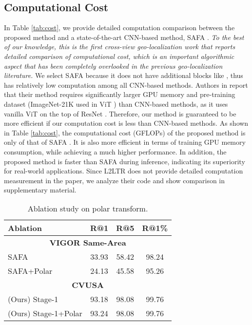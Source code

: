 \documentclass[10pt,twocolumn,letterpaper]{article}
\begin{document}
\subsection{Computational Cost}
\label{sec:cost}
In Table \ref{tab:cost}, we provide detailed computation comparison between the proposed method and a state-of-the-art CNN-based method, \ie SAFA \cite{SAFA}. \emph{To the best of our knowledge, this is the first cross-view geo-localization work that reports detailed comparison of computational cost, which is an important algorithmic aspect that has been completely overlooked in the previous geo-localization literature.} We select SAFA because it does not have additional blocks like \cite{UCF,toker2021coming}, thus has relatively low computation among all CNN-based methods. Authors in \cite{yang2021cross} report that their method requires significantly larger GPU memory and pre-training dataset (ImageNet-21K used in ViT \cite{vit}) than CNN-based methods, as it uses vanilla ViT on the top of ResNet \cite{he2016deep}. Therefore, our method is guaranteed to be more efficient if our computation cost is less than CNN-based methods. As shown in Table \ref{tab:cost}, the computational cost (GFLOPs) of the proposed method is only  of that of SAFA \cite{SAFA}. It is also more efficient in terms of training GPU memory consumption, while achieving a much higher performance. In addition, the proposed method is faster than SAFA during inference, indicating its superiority for real-world applications. Since L2LTR \cite{yang2021cross} does not provide detailed computation measurement in the paper, we analyze their code and show comparison in supplementary material.

\begin{table}[!htbp]
\small
\centering
\begin{tabular}{l c c c } \hline

\hline
Ablation & R@1 & R@5 & R@1\% \\\hline
\hline
 \multicolumn{4}{c}{\textbf{VIGOR Same-Area}}\\
\hline
SAFA \cite{SAFA,zhu2021vigor} &  33.93 & 58.42 & 98.24  \\
SAFA+Polar & 24.13 & 45.58 & 95.26  \\
\hline
 \multicolumn{4}{c}{\textbf{CVUSA}}\\
\hline
(Ours) Stage-1 &  93.18 & 98.08 & 99.76\\
(Ours) Stage-1+Polar &  93.24 & 98.08 & 99.76 \\
\hline

\hline
\end{tabular}
\caption{Ablation study on polar transform.}
\label{tab:polar}
\vspace{-0.2cm}
\end{table}
\end{document}
